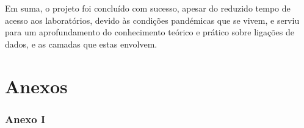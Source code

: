 \documentclass[article, a4paper, 11pt, oneside]{memoir}
\begin{document}
Em suma, o projeto foi concluído com sucesso, apesar do reduzido tempo de acesso aos laboratórios, devido às condições pandémicas que se vivem, 
e serviu para um aprofundamento do conhecimento teórico e prático sobre ligações de dados, e as camadas que estas envolvem.

\newpage
\chapter[Anexos][Anexos]{Anexos} \label{\thechapter}


\subsection{Anexo I}
\end{document}
